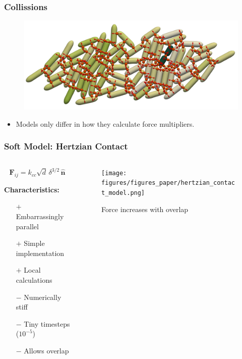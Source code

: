 \documentclass[10pt,t]{beamer}
\begin{document}
\begin{frame}
    \frametitle{Collissions}

    \begin{figure}
        \centering
        \includegraphics[width=1\textwidth]{figures/constraints.jpeg}
    \end{figure}


    \begin{itemize}
        \item Models only differ in how they calculate force multipliers.
    \end{itemize}

\end{frame}


\begin{frame}
    \frametitle{Soft Model: Hertzian Contact}

    \begin{columns}
        \begin{column}{0.5\textwidth}
            \begin{equation*}
                \mathbf{F}_{ij} = k_{cc} \sqrt{d} \, \delta^{3/2} \, \hat{\mathbf{n}}
            \end{equation*}

            \vspace{0.3cm}

            \textbf{Characteristics:}
            \begin{itemize}
                \item[$+$] Embarrassingly parallel
                \item[$+$] Simple implementation
                \item[$+$] Local calculations
                \item[$-$] Numerically stiff
                \item[$-$] Tiny timesteps ($10^{-5}$)
                \item[$-$] Allows overlap
            \end{itemize}
        \end{column}

        \begin{column}{0.5\textwidth}
            \begin{figure}
                \centering
                \texttt{[image: figures/figures\_paper/hertzian\_contact\_model.png]}
                \caption*{\scriptsize{Force increases with overlap}}
            \end{figure}
        \end{column}
    \end{columns}

\end{frame}
\end{document}
